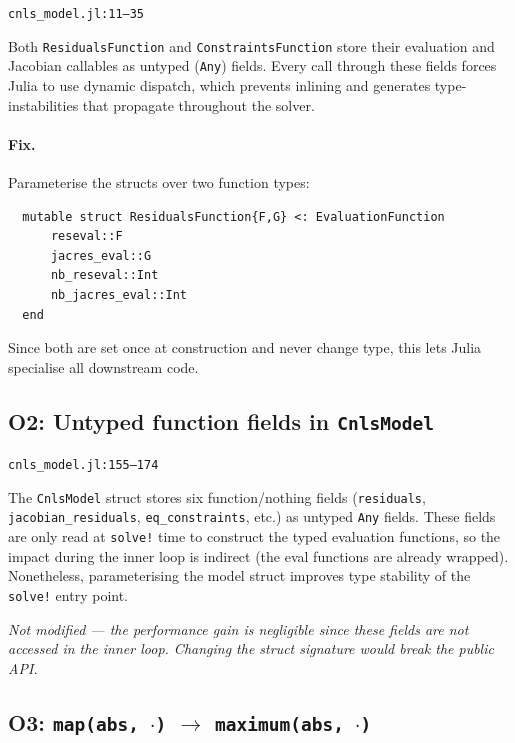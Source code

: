 \documentclass[11pt, a4paper]{article}
\newcommand{\juliaref}[2]{\texttt{#1:#2}}
\begin{document}
\juliaref{cnls\_model.jl}{11--35}

Both \texttt{ResidualsFunction} and \texttt{ConstraintsFunction} store
their evaluation and Jacobian callables as untyped (\texttt{Any}) fields.
Every call through these fields forces Julia to use dynamic dispatch,
which prevents inlining and generates type-instabilities that propagate
throughout the solver.

\paragraph{Fix.}
Parameterise the structs over two function types:
\begin{lstlisting}
  mutable struct ResidualsFunction{F,G} <: EvaluationFunction
      reseval::F
      jacres_eval::G
      nb_reseval::Int
      nb_jacres_eval::Int
  end
\end{lstlisting}
Since both are set once at construction and never change type,
this lets Julia specialise all downstream code.

\subsection{O2: Untyped function fields in \texttt{CnlsModel}}
\label{sec:o2}

\juliaref{cnls\_model.jl}{155--174}

The \texttt{CnlsModel} struct stores six function/nothing fields
(\texttt{residuals}, \texttt{jacobian\_residuals}, \texttt{eq\_constraints},
etc.) as untyped \texttt{Any} fields.  These fields are only read at
\texttt{solve!} time to construct the typed evaluation functions, so the
impact during the inner loop is indirect (the eval functions are already
wrapped).  Nonetheless, parameterising the model struct improves
type stability of the \texttt{solve!} entry point.

\medskip\noindent
\textit{Not modified --- the performance gain is negligible since these
fields are not accessed in the inner loop.  Changing the struct signature
would break the public API.}

\subsection{O3: \texttt{map(abs, $\cdot$)} $\to$ \texttt{maximum(abs, $\cdot$)}}
\label{sec:o3}
\end{document}
